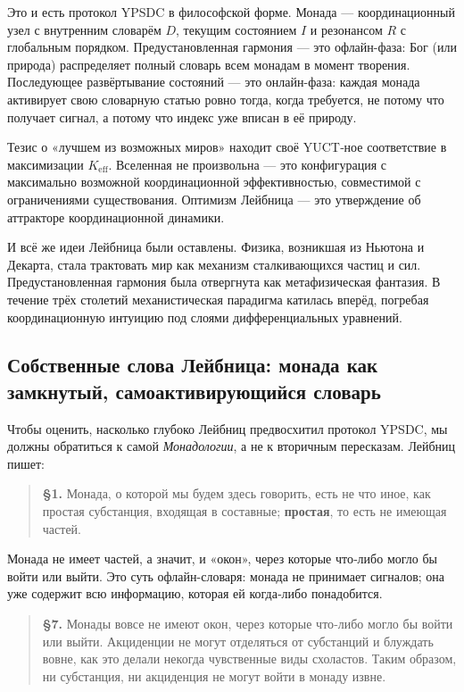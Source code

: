 \documentclass[12pt,a4paper]{article}
\begin{document}
	Это и есть протокол YPSDC в философской форме. Монада — координационный узел с внутренним словарём \(D\), текущим состоянием \(I\) и резонансом \(R\) с глобальным порядком. Предустановленная гармония — это офлайн-фаза: Бог (или природа) распределяет полный словарь всем монадам в момент творения. Последующее развёртывание состояний — это онлайн-фаза: каждая монада активирует свою словарную статью ровно тогда, когда требуется, не потому что получает сигнал, а потому что индекс уже вписан в её природу.
	
	Тезис о «лучшем из возможных миров» находит своё YUCT‑ное соответствие в максимизации \(K_{\mathrm{eff}}\). Вселенная не произвольна — это конфигурация с максимально возможной координационной эффективностью, совместимой с ограничениями существования. Оптимизм Лейбница — это утверждение об аттракторе координационной динамики.
	
	И всё же идеи Лейбница были оставлены. Физика, возникшая из Ньютона и Декарта, стала трактовать мир как механизм сталкивающихся частиц и сил. Предустановленная гармония была отвергнута как метафизическая фантазия. В течение трёх столетий механистическая парадигма катилась вперёд, погребая координационную интуицию под слоями дифференциальных уравнений.
	
	\subsection{Собственные слова Лейбница: монада как замкнутый, самоактивирующийся словарь}
	
	Чтобы оценить, насколько глубоко Лейбниц предвосхитил протокол YPSDC, мы должны обратиться к самой \emph{Монадологии}, а не к вторичным пересказам. Лейбниц пишет:
	
	\begin{quote}
		\textbf{§1.} Монада, о которой мы будем здесь говорить, есть не что иное, как простая субстанция, входящая в составные; \textbf{простая}, то есть не имеющая частей.
	\end{quote}
	
	Монада не имеет частей, а значит, и «окон», через которые что‑либо могло бы войти или выйти. Это суть офлайн-словаря: монада не принимает сигналов; она уже содержит всю информацию, которая ей когда‑либо понадобится.
	
	\begin{quote}
		\textbf{§7.} Монады вовсе не имеют окон, через которые что‑либо могло бы войти или выйти. Акциденции не могут отделяться от субстанций и блуждать вовне, как это делали некогда чувственные виды схоластов. Таким образом, ни субстанция, ни акциденция не могут войти в монаду извне.
	\end{quote}
	
\end{document}
